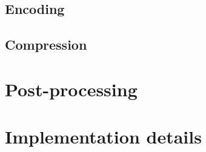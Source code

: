 

\subsection {Encoding}

\subsection {Compression}

\section{Post-processing}
\label{sec:postprocessing}


\section{Implementation details}
\label{sec:implementation-details}


